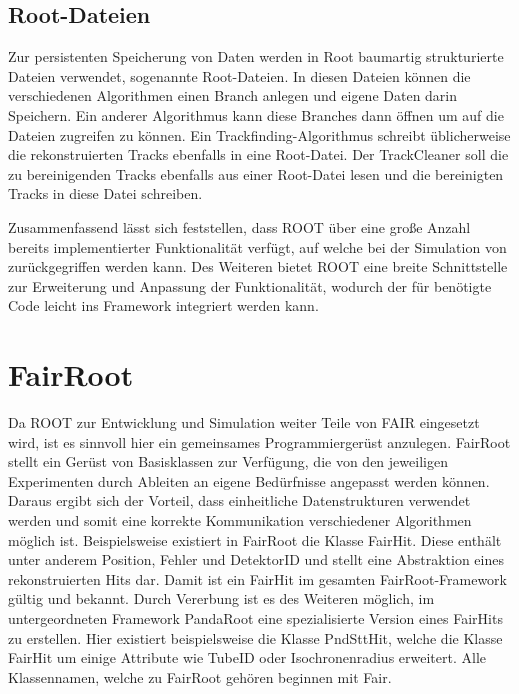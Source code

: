 \subsection{Root-Dateien}
Zur persistenten Speicherung von Daten werden in Root baumartig strukturierte Dateien verwendet, sogenannte Root-Dateien. In diesen Dateien können die verschiedenen Algorithmen einen Branch anlegen und eigene Daten darin Speichern. Ein anderer Algorithmus kann diese Branches dann öffnen um auf die Dateien zugreifen zu können. Ein Trackfinding-Algorithmus schreibt üblicherweise die rekonstruierten Tracks ebenfalls in eine Root-Datei. Der TrackCleaner soll die zu bereinigenden Tracks ebenfalls aus einer Root-Datei lesen und die bereinigten Tracks in diese Datei schreiben.

Zusammenfassend lässt sich feststellen, dass ROOT über eine große Anzahl bereits implementierter Funktionalität verfügt, auf welche bei der Simulation von \pnd{} zurückgegriffen werden kann. Des Weiteren bietet ROOT eine breite Schnittstelle zur Erweiterung und Anpassung der Funktionalität, wodurch der für \pnd{} benötigte Code leicht ins Framework integriert werden kann.

\section{FairRoot}
Da ROOT zur Entwicklung und Simulation weiter Teile von FAIR eingesetzt wird, ist es sinnvoll hier ein gemeinsames Programmiergerüst anzulegen.
FairRoot stellt ein Gerüst von Basisklassen zur Verfügung, die von den jeweiligen Experimenten durch Ableiten an eigene Bedürfnisse angepasst werden können. Daraus ergibt sich der Vorteil, dass einheitliche Datenstrukturen verwendet werden und somit eine korrekte Kommunikation verschiedener Algorithmen möglich ist. Beispielsweise existiert in FairRoot die Klasse FairHit. Diese enthält unter anderem Position, Fehler und DetektorID und stellt eine Abstraktion eines rekonstruierten Hits dar. Damit ist ein FairHit im gesamten FairRoot-Framework gültig und bekannt. Durch Vererbung ist es des Weiteren möglich, im untergeordneten Framework PandaRoot eine spezialisierte Version eines FairHits zu erstellen. Hier existiert beispielsweise die Klasse PndSttHit, welche die Klasse FairHit um einige Attribute wie TubeID oder Isochronenradius erweitert. Alle Klassennamen, welche zu FairRoot gehören beginnen mit Fair.

